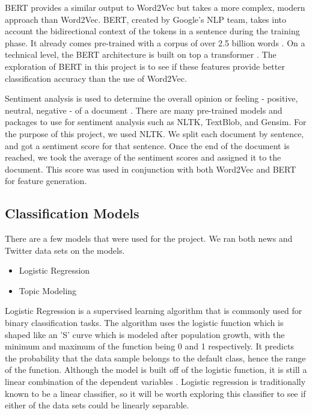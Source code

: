 \documentclass[conference]{IEEEtran}
\begin{document}
BERT provides a similar output to Word2Vec but takes a more complex, modern approach than Word2Vec. BERT, created by Google's NLP team, takes into account the bidirectional context of the tokens in a sentence during the training phase. It already comes pre-trained with a corpus of over 2.5 billion words \cite{b12}. On a technical level, the BERT architecture is built on top a transformer \cite{b11}. The exploration of BERT in this project is to see if these features provide better classification accuracy than the use of Word2Vec.

Sentiment analysis is used to determine the overall opinion or feeling - positive, neutral, negative - of a document \cite{b8}. There are many pre-trained models and packages to use for sentiment analysis such as NLTK, TextBlob, and Gensim. For the purpose of this project, we used NLTK. We split each document by sentence, and got a sentiment score for that sentence. Once the end of the document is reached, we took the average of the sentiment scores and assigned it to the document. This score was used in conjunction with both Word2Vec and BERT for feature generation.

\subsection{Classification Models}
There are a few models that were used for the project. We ran both news and Twitter data sets on the models.
\begin{itemize}
    \item Logistic Regression
    \item Topic Modeling
\end{itemize}

Logistic Regression is a supervised learning algorithm that is commonly used for binary classification tasks. The algorithm uses the logistic function which is shaped like an 'S' curve which is modeled after population growth, with the minimum and maximum of the function being 0 and 1 respectively. It predicts the probability that the data sample belongs to the default class, hence the range of the function. Although the model is built off of the logistic function, it is still a linear combination of the dependent variables \cite{b7}. Logistic regression is traditionally known to be a linear classifier, so it will be worth exploring this classifier to see if either of the data sets could be linearly separable.
\end{document}
